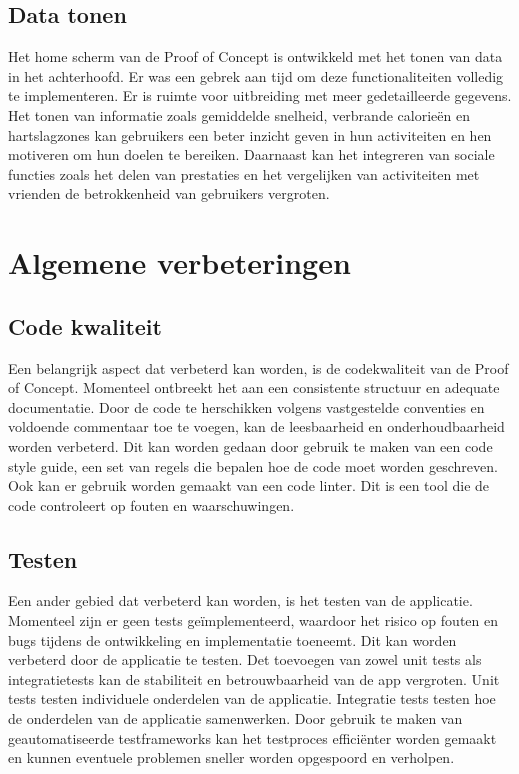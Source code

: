 \subsection{Data tonen}

Het home scherm van de Proof of Concept is ontwikkeld met het tonen van data in het achterhoofd. Er was een gebrek aan tijd om deze functionaliteiten volledig te implementeren. Er is ruimte voor uitbreiding met meer gedetailleerde gegevens. Het tonen van informatie zoals gemiddelde snelheid, verbrande calorieën en hartslagzones kan gebruikers een beter inzicht geven in hun activiteiten en hen motiveren om hun doelen te bereiken. Daarnaast kan het integreren van sociale functies zoals het delen van prestaties en het vergelijken van activiteiten met vrienden de betrokkenheid van gebruikers vergroten.

\section{Algemene verbeteringen}

\subsection{Code kwaliteit}

Een belangrijk aspect dat verbeterd kan worden, is de codekwaliteit van de Proof of Concept. Momenteel ontbreekt het aan een consistente structuur en adequate documentatie. Door de code te herschikken volgens vastgestelde conventies en voldoende commentaar toe te voegen, kan de leesbaarheid en onderhoudbaarheid worden verbeterd.  Dit kan worden gedaan door gebruik te maken van een code style guide, een set van regels die bepalen hoe de code moet worden geschreven. Ook kan er gebruik worden gemaakt van een code linter. Dit is een tool die de code controleert op fouten en waarschuwingen.

\subsection{Testen}

Een ander gebied dat verbeterd kan worden, is het testen van de applicatie. Momenteel zijn er geen tests geïmplementeerd, waardoor het risico op fouten en bugs tijdens de ontwikkeling en implementatie toeneemt. Dit kan worden verbeterd door de applicatie te testen. Det toevoegen van zowel unit tests als integratietests kan de stabiliteit en betrouwbaarheid van de app vergroten. Unit tests testen individuele onderdelen van de applicatie. Integratie tests testen hoe de onderdelen van de applicatie samenwerken. Door gebruik te maken van geautomatiseerde testframeworks kan het testproces efficiënter worden gemaakt en kunnen eventuele problemen sneller worden opgespoord en verholpen. 

